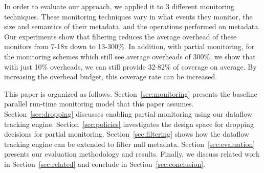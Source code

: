 In order to evaluate our approach, we applied it to 3 different monitoring
techniques. These monitoring techniques vary in what events they monitor, the
size and semantics of their metadata, and the operations performed on metadata.
Our experiments show that filtering reduces the average overhead of these
monitors from 7-18x down to 13-300\%.
In addition, with partial monitoring, for the monitoring schemes which still
see average overheads of 300\%, we show that with just 10\% overheads, we can still
provide 32-82\% of coverage on average. By increasing the
overhead budget, this coverage rate can be increased. 

This paper is organized as follows. Section~\ref{sec:monitoring} presents the
baseline parallel run-time monitoring model that this paper assumes.
Section~\ref{sec:dropping} discusses enabling partial monitoring using our dataflow tracking engine.
Section~\ref{sec:policies}
investigates the design space for dropping decisions for partial monitoring.
Section~\ref{sec:filtering} shows how the dataflow tracking engine can be extended to filter null metadata.
Section~\ref{sec:evaluation} presents our evaluation methodology and
results. Finally, we discuss related work in Section~\ref{sec:related} and
conclude in Section~\ref{sec:conclusion}.

